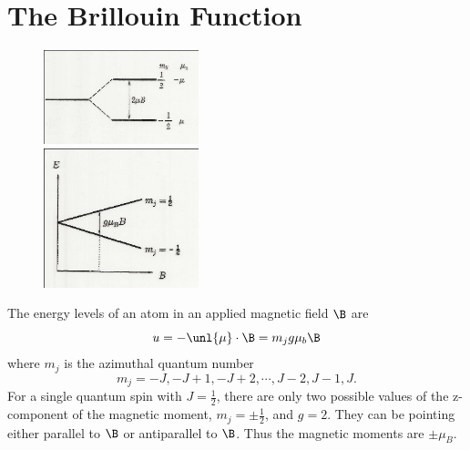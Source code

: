 \documentclass[a4paper, 11pt, normalem]{report}
\begin{document}
\section{The Brillouin Function}
\begin{figure}
    \centering
    \includegraphics[width=0.4\textwidth]{mub1.png}\\
    \includegraphics[width=0.4\textwidth]{mub2.png}
\end{figure}
The energy levels of an atom in an applied magnetic field $\B$ are
\begin{equation}
    u = -\unl{\mu}\cdot\B = m_jg\mu_b\B
\end{equation}
where $m_j$ is the azimuthal quantum number
\begin{equation}
    m_j = -J,-J+1,-J+2,\cdots,J-2,J-1,J.
\end{equation}
For a single quantum spin with $J = \frac12$, there are only two possible values of the z-component of the magnetic moment, $m_j = \pm\frac12$, and $g=2$.
They can be pointing either parallel to $\B$ or antiparallel to $\B$.
Thus the magnetic moments are $\pm\mu_B$.
\end{document}
